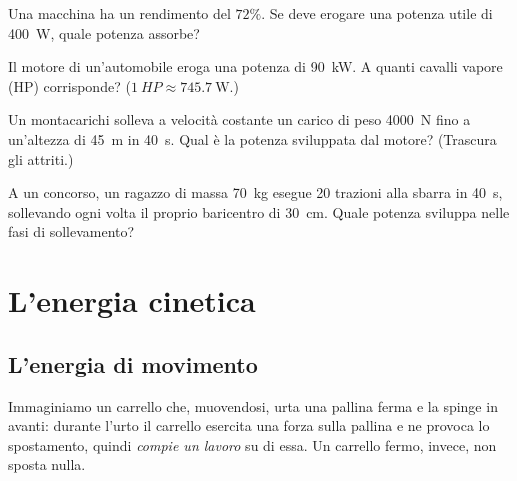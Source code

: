 \begin{esercizio}
Una macchina ha un rendimento del $72\%$. Se deve erogare una potenza utile di \SI{400}{\watt}, quale potenza assorbe?\\
\end{esercizio}

\begin{esercizio}
Il motore di un'automobile eroga una potenza di \SI{90}{\kilo\watt}. A quanti cavalli vapore (HP) corrisponde? ($\SI{1}{HP} \approx \SI{745,7}{\watt}$.)\\
\end{esercizio}

\begin{esercizio}
Un montacarichi solleva a velocità costante un carico di peso \SI{4000}{\newton} fino a un'altezza di \SI{45}{\metre} in \SI{40}{\second}. Qual è la potenza sviluppata dal motore? (Trascura gli attriti.)\\
\end{esercizio}

\begin{esercizio}
A un concorso, un ragazzo di massa \SI{70}{\kilo\gram} esegue \num{20} trazioni alla sbarra in \SI{40}{\second}, sollevando ogni volta il proprio baricentro di \SI{30}{\centi\metre}. Quale potenza sviluppa nelle fasi di sollevamento?\\
\end{esercizio}

\section{L'energia cinetica}

\subsection{L'energia di movimento}

Immaginiamo un carrello che, muovendosi, urta una pallina ferma e la spinge in avanti: durante l'urto il carrello esercita una forza sulla pallina e ne provoca lo spostamento, quindi \emph{compie un lavoro} su di essa. Un carrello fermo, invece, non sposta nulla.

